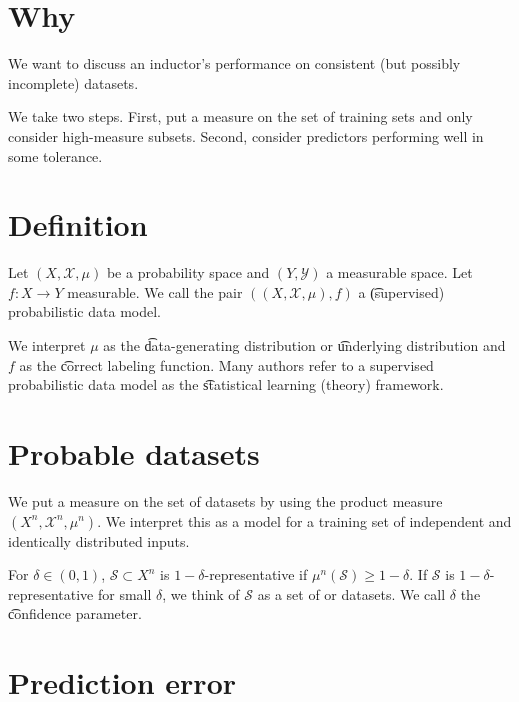 

\section*{Why}

We want to discuss an inductor's performance on consistent (but possibly incomplete) datasets.

We take two steps. First, put a measure on the set of training sets and only consider high-measure subsets.
Second, consider predictors performing well in some tolerance.

\section*{Definition}

Let $(X, \mathcal{X} , \mu )$ be a probability space and $(Y, \mathcal{Y} )$ a measurable space.
Let $f: X \to Y$ measurable.
We call the pair $((X, \mathcal{X} , \mu ), f)$ a \t{(supervised) probabilistic data model}.

We interpret $\mu $ as the \t{data-generating distribution} or \t{underlying distribution} and $f$ as the \t{correct labeling function}.
Many authors refer to a supervised probabilistic data model as the \t{statistical learning (theory) framework}.

\section*{Probable datasets}

We put a measure on the set of datasets by using the product measure $(X^n, \mathcal{X} ^n, \mu ^n)$.
We interpret this as a model for a training set of independent and identically distributed inputs.


For $\delta  \in (0, 1)$, $\mathcal{S}  \subset X^n$ is \t{$1-\delta $-representative} if $\mu ^n(\mathcal{S} ) \geq 1 - \delta $.
If $\mathcal{S} $ is $1-\delta $-representative for small $\delta $, we think of $\mathcal{S} $ as a set of  or  datasets.
We call $\delta $ the \t{confidence parameter}.

\section*{Prediction error}

